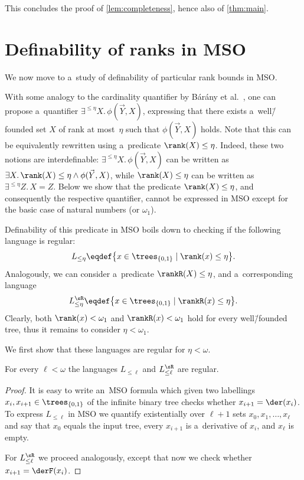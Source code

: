 This concludes the proof of \cref{lem:completeness}, hence also of \cref{thm:main}.



\section{Definability of ranks in MSO}
\label{sec:definability}

We now move to a~study of definability of particular rank bounds in MSO.

With some analogy to the cardinality quantifier by B\'ar\'any et al.~\cite{barany_expressing_trees},
one can propose a~quantifier $\exists^{\leq \eta} X.\,\phi(\vec{Y},X)$, expressing that there exists a~well\=/founded set $X$ of rank at most~$\eta$ such that $\phi(\vec{Y},X)$ holds.
Note that this can be equivalently rewritten using a~predicate $\rank(X)\leq \eta$.
Indeed, these two notions are interdefinable: $\exists^{\leq \eta} X.\,\phi(\vec{Y},X)$ can be written as $\exists X.\,\rank(X)\leq \eta\land\phi(\vec{Y},X)$,
while $\rank(X)\leq \eta$ can be written as $\exists^{\leq \eta} Z.\,X=Z$.
Below we show that the predicate $\rank(X)\leq \eta$, and consequently the respective quantifier, cannot be expressed in MSO except for the basic case of natural numbers (or $\omega_1$).

Definability of this predicate in MSO boils down to checking if the following language is regular:
\[L_{\leq\eta}\eqdef \big\{x\in\trees_{\{0,1\}}\mid \rank(x)\leq \eta\big\}.\]
Analogously, we can consider a~predicate $\rankR(X)\leq \eta$, and a~corresponding language
\[L^{\sR}_{\leq\eta}\eqdef \big\{x\in\trees_{\{0,1\}}\mid \rankR(x)\leq \eta\big\}.\]
Clearly, both $\rank(x)<\omega_1$ and $\rankR(x)<\omega_1$ hold for every well\=/founded tree, thus it remains to consider $\eta<\omega_1$.

We first show that these languages are regular for $\eta<\omega$.

\begin{fact}\label{ft:rank-definable}
	For every $\ell<\omega$ the languages $L_{\leq\ell}$ and $L^{\sR}_{\leq\ell}$ are regular.
\end{fact}

\begin{proof}
	It is easy to write an~MSO formula which given two labellings $x_i,x_{i+1}\in\trees_{\{0,1\}}$ of the infinite binary tree checks whether $x_{i+1}=\der(x_i)$.
	To express $L_{\leq\ell}$ in MSO we quantify existentially over $\ell+1$ sets $x_0,x_1,\dots,x_\ell$ and say that $x_0$ equals the input tree,
	every $x_{i+1}$ is a~derivative of $x_i$, and $x_\ell$ is empty.
	
	For $L^{\sR}_{\leq\ell}$ we proceed analogously, except that now we check whether $x_{i+1}=\derF(x_i)$.
\end{proof}

